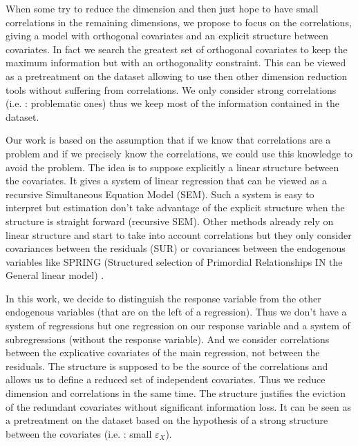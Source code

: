 \documentclass[11pt,a4paper]{article}
\begin{document}
 When some try to reduce the dimension and then just hope to have small correlations in the remaining dimensions,  we propose to focus on the correlations, giving a model with orthogonal covariates and an explicit structure between covariates. In fact we search the greatest set of orthogonal covariates to keep the maximum information but with an orthogonality constraint. This can be viewed as a pretreatment on the dataset allowing to use then other dimension reduction tools without suffering from correlations. We only consider strong correlations (i.e. : problematic ones) thus we keep most of the information contained in the dataset. 
 
	Our work is based on the assumption that if we know that correlations are a problem and if we precisely know the correlations, we could use this knowledge to avoid the problem.
	The idea is to suppose explicitly a linear structure between the covariates. 
	It gives a system of linear regression that can be viewed as a recursive Simultaneous Equation Model (SEM)\cite{davidson1993estimation}. Such a system is easy to interpret but estimation don't take advantage of the explicit structure \cite{TIMM} when the structure is straight forward (recursive SEM).
  	Other methods already rely on linear structure and start to take into account correlations but they only consider covariances between the residuals (SUR) \cite{SURzellner} or covariances between the endogenous variables like SPRING (Structured selection of Primordial Relationships IN the General linear model) \cite{chiquetconf}.

 	
	  In this work, we decide to distinguish the response variable from the other endogenous variables (that are on the left of a regression). Thus we don't have a system of regressions but one regression on our response variable and a system of subregressions (without the response variable). And we consider correlations between the explicative covariates of the main regression, not between the residuals.
	  The structure is supposed to be the source of the correlations and allows us to define a reduced set of independent covariates. Thus we reduce dimension and correlations in the same time. The structure justifies the eviction of the redundant covariates without significant information loss. It can be seen as a pretreatment on the dataset based on the hypothesis of a strong structure between the covariates (i.e. : small $\varepsilon_X$).
	  
\end{document}
